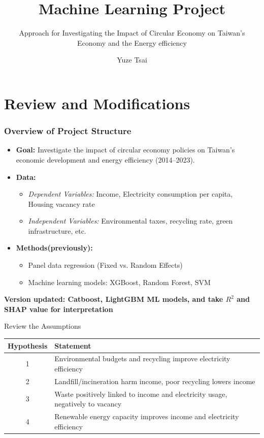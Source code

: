 \documentclass{beamer}
\author{Yuze Tsai}
\title{Machine Learning Project}
\subtitle{Approach for Investigating the Impact of Circular Economy on Taiwan's Economy and the Energy efficiency}
\begin{document}
    \frame {
        \titlepage
    }

\section{Review and Modifications}

\begin{frame}
    \frametitle{Overview of Project Structure}
    \begin{itemize}
        \item \textbf{Goal:} Investigate the impact of circular economy policies on Taiwan's economic development and energy efficiency (2014–2023).
        \item \textbf{Data:} 
        \begin{itemize}
            \item \textit{Dependent Variables:} Income, Electricity consumption per capita, Housing vacancy rate
            \item \textit{Independent Variables:} Environmental taxes, recycling rate, green infrastructure, etc.
        \end{itemize}
        \item \textbf{Methods(previously):}
        \begin{itemize}
            \item Panel data regression (Fixed vs. Random Effects)
            \item Machine learning models: XGBoost, Random Forest, SVM
        \end{itemize}
    \end{itemize}
    \vspace{0.5cm}
    \textbf{\textcolor{red!70!black}{Version updated: Catboost, LightGBM ML models, and take $R^2$ and SHAP value for interpretation}} 
\end{frame}

\begin{frame}{Review the Assumptions}
\begin{table}[H]
    \centering
    \begin{tabular}{|c|p{8cm}|}
    \hline
    \textbf{Hypothesis} & \textbf{Statement} \\
    \hline
    1 & Environmental budgets and recycling improve electricity efficiency  \\
    \hline
    2 & Landfill/incineration harm income, poor recycling lowers income \\
    \hline
    3 & Waste positively linked to income and electricity usage, negatively to vacancy \\
    \hline
    4 & Renewable energy capacity improves income and electricity efficiency \\
    \hline
    \end{tabular}
\end{table}
\end{frame}
\end{document}
